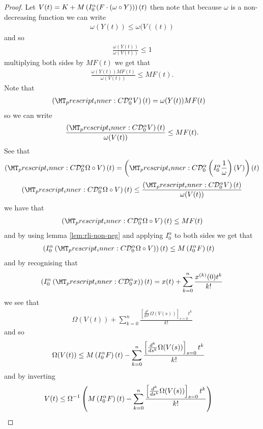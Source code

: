 \documentclass{unswmaths}
\begin{document}
\begin{proof}
	Let $ V(t) = K + M\left( I_{0}^{\alpha} (F\cdot (\omega \circ Y)) \right)(t) $ then note that because
	$ \omega $ is a non-decreasing function we can write
	\begin{align*}
		\omega(Y(t)) \leq \omega(V((t))
	\end{align*}
	and so
	\begin{align*}
		\frac{\omega(Y(t))}{\omega(V(t))} \leq 1
	\end{align*}
	multiplying both sides by $ M F(t) $ we get that
	\begin{align*}
		\frac{\omega(Y(t))MF(t)}{\omega(V(t))} \leq MF(t).
	\end{align*}
	Note that
	\begin{align*}
		\capder{0}{\alpha}{V}(t) &= \omega(Y(t))MF(t)
	\end{align*}
	so we can write
	\begin{align*}
		\frac{\capder{0}{\alpha}{V}(t)}{\omega(V(t))} \leq MF(t).
	\end{align*}
	See that 
	\begin{align*}
		\capder{0}{\alpha}{\Omega \circ V }(t) = \capder{0}{\alpha}{\rli{0}{\alpha}{\frac{1}{\omega}}(V)}(t)
	\end{align*}
	\begin{align*}
		\capder{0}{\alpha}{\Omega \circ V }(t) \leq \frac{\capder{0}{\alpha}{V}(t)}{\omega(V(t))}
	\end{align*}
	we have that
	\begin{align*}
		\capder{0}{\alpha}{\Omega \circ V }(t) \leq  MF(t)
	\end{align*}
	and by using lemma \ref{lem:rli-non-neg}  and applying $ I_0^\alpha $ to both sides we get that 
	\begin{align*}
		\rli{0}{\alpha}{\capder{0}{\alpha}{\Omega \circ V }}(t) &\leq M\rli{0}{\alpha}{F}(t)
	\end{align*}
	and by recognising that 
	\begin{align*}
		\rli{0}{\alpha}{\capder{0}{\alpha}{x}}(t) = x(t) + \sum_{k=0}^{n} \frac{x^{(k)}(0)t^{k}}{k!}
	\end{align*}
	we see that
	\begin{align*}
		\Omega(V(t)) + \sum_{k=0}^{n} \frac{\left[\frac{d^k}{ds^k} \Omega(V(s)) \right]_{s=0}t^{k}}{k!}
	\end{align*}
	and so 
	\begin{align*}
		\Omega(V(t)) &\leq M\left( I_{0}^{\alpha} F \right)(t) - \sum_{k=0}^{n} \frac{\left[\frac{d^k}{ds^k} \Omega(V(s)) \right]_{s=0}t^{k}}{k!}
	\end{align*}
	and by inverting
	\begin{align*}
		V(t) &\leq \Omega^{-1} \left( M\left( I_{0}^{\alpha} F \right)(t) - \sum_{k=0}^{n} \frac{\left[\frac{d^k}{ds^k} \Omega(V(s)) \right]_{s=0}t^{k}}{k!} \right)
	\end{align*}
\end{proof}





\end{document}
